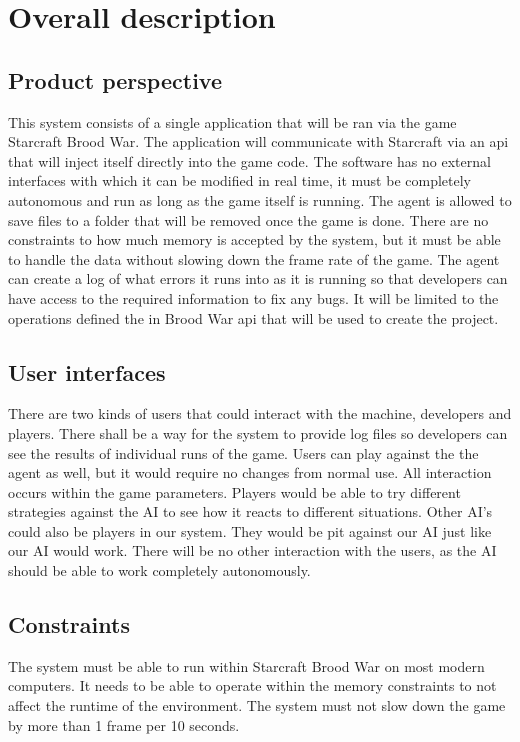 \section{Overall description}

\subsection{Product perspective}
This system consists of a single application that will be ran via the game Starcraft Brood War.
The application will communicate with Starcraft via an api that will inject itself directly into the game code.
The software has no external interfaces with which it can be modified in real time, it must be completely autonomous and run as long as the game itself is running.
The agent is allowed to save files to a folder that will be removed once the game is done. There are no constraints to how much memory is accepted by the system,
but it must be able to handle the data without slowing down the frame rate of the game.
The agent can create a log of what errors it runs into as it is running so that developers can have access to the required information to fix any bugs.
It will be limited to the operations defined the in Brood War api that will be used to create the project.

\subsection{User interfaces}
There are two kinds of users that could interact with the machine, developers and players.
There shall be a way for the system to provide log files so developers can see the results of individual runs of the game.
Users can play against the the agent as well, but it would require no changes from normal use. All interaction occurs within the game parameters.
Players would be able to try different strategies against the AI to see how it reacts to different situations.
Other AI's could also be players in our system. They would be pit against our AI just like our AI would work.
There will be no other interaction with the users, as the AI should be able to work completely autonomously.

\subsection{Constraints}
The system must be able to run within Starcraft Brood War on most modern computers. It needs to be able to operate within the memory constraints to not affect the runtime of the environment.
The system must not slow down the game by more than 1 frame per 10 seconds. 

